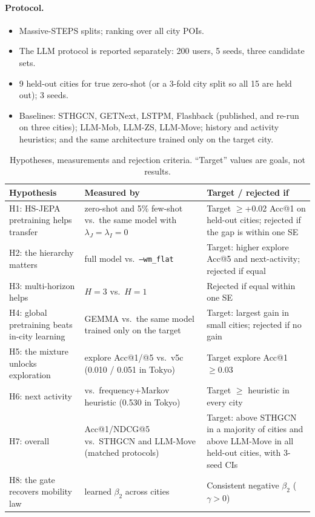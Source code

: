 \documentclass[10.5pt]{article}
\begin{document}
\paragraph{Protocol.}
\begin{itemize}
\item Massive-STEPS splits; ranking over all city POIs.
\item The LLM protocol is reported separately: 200 users, 5 seeds, three candidate sets.
\item 9 held-out cities for true zero-shot (or a 3-fold city split so all 15 are held out); 3 seeds.
\item Baselines: STHGCN, GETNext, LSTPM, Flashback (published, and re-run on three cities); LLM-Mob, LLM-ZS,
LLM-Move; history and activity heuristics; and the same architecture trained only on the target city.
\end{itemize}

\begin{table}[h]
\centering\small
\caption{Hypotheses, measurements and rejection criteria. ``Target'' values are goals, not results.}
\begin{tabularx}{\linewidth}{>{\raggedright\arraybackslash}p{4.3cm}>{\raggedright\arraybackslash}p{3.2cm}X}
\toprule
Hypothesis & Measured by & Target / rejected if \\
\midrule
H1: HS-JEPA pretraining helps transfer & zero-shot and 5\% few-shot vs.\ the same model with $\lambda_J{=}\lambda_I{=}0$ & Target $\ge$+0.02 Acc@1 on held-out cities; rejected if the gap is within one SE \\
H2: the hierarchy matters & full model vs.\ \texttt{--wm\_flat} & Target: higher explore Acc@5 and next-activity; rejected if equal \\
H3: multi-horizon helps & $H{=}3$ vs.\ $H{=}1$ & Rejected if equal within one SE \\
H4: global pretraining beats in-city learning & GEMMA vs.\ the same model trained only on the target & Target: largest gain in small cities; rejected if no gain \\
H5: the mixture unlocks exploration & explore Acc@1/@5 vs.\ v5c (0.010 / 0.051 in Tokyo) & Target explore Acc@1 $\ge 0.03$ \\
H6: next activity & vs.\ frequency+Markov heuristic (0.530 in Tokyo) & Target $\ge$ heuristic in every city \\
H7: overall & Acc@1/NDCG@5 vs.\ STHGCN and LLM-Move (matched protocols) & Target: above STHGCN in a majority of cities and above LLM-Move in all held-out cities, with 3-seed CIs \\
H8: the gate recovers mobility law & learned $\beta_2$ across cities & Consistent negative $\beta_2$ ($\gamma>0$) \\
\bottomrule
\end{tabularx}
\end{table}
\end{document}
